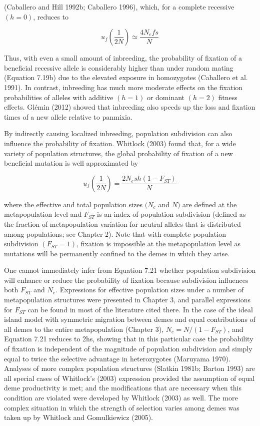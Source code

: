 \documentclass{article}
\begin{document}
(Caballero and Hill 1992b; Caballero 1996), which, for a complete recessive  $ (h = 0) $, reduces to

\begin{equation}
u_{f}\left(\frac{1}{2N}\right)\simeq\frac{4N_{e}f s}{N}
\tag{7.20c}
\label{eq:7_20c}
\end{equation}

Thus, with even a small amount of inbreeding, the probability of fixation of a beneficial recessive allele is considerably higher than under random mating (Equation 7.19b) due to the elevated exposure in homozygotes (Caballero et al. 1991). In contrast, inbreeding has much more moderate effects on the fixation probabilities of alleles with additive  $ (h=1) $ or dominant  $ (h=2) $ fitness effects. Glémin (2012) showed that inbreeding also speeds up the loss and fixation times of a new allele relative to panmixia.

By indirectly causing localized inbreeding, population subdivision can also influence the probability of fixation. Whitlock (2003) found that, for a wide variety of population structures, the global probability of fixation of a new beneficial mutation is well approximated by

\begin{equation}
u_{f}\left(\frac{1}{2N}\right)=\frac{2N_{e}s h(1-F_{S T})}{N}
\tag{7.21}
\label{eq:7_21}
\end{equation}

where the effective and total population sizes  $ (N_e $ and  $ N) $ are defined at the metapopulation level and  $ F_{ST} $ is an index of population subdivision (defined as the fraction of metapopulation variation for neutral alleles that is distributed among populations; see Chapter 2). Note that with complete population subdivision  $ (F_{ST} = 1) $, fixation is impossible at the metapopulation level as mutations will be permanently confined to the demes in which they arise.

One cannot immediately infer from Equation 7.21 whether population subdivision will enhance or reduce the probability of fixation because subdivision influences both  $ F_{ST} $ and  $ N_{e} $. Expressions for effective population sizes under a number of metapopulation structures were presented in Chapter 3, and parallel expressions for  $ F_{ST} $ can be found in most of the literature cited there. In the case of the ideal island model with symmetric migration between demes and equal contributions of all demes to the entire metapopulation (Chapter 3),  $ N_{e} = N/(1 - F_{ST}) $, and Equation 7.21 reduces to 2hs, showing that in this particular case the probability of fixation is independent of the magnitude of population subdivision and simply equal to twice the selective advantage in heterozygotes (Maruyama 1970). Analyses of more complex population structures (Slatkin 1981b; Barton 1993) are all special cases of Whitlock's (2003) expression provided the assumption of equal deme productivity is met; and the modifications that are necessary when this condition are violated were developed by Whitlock (2003) as well. The more complex situation in which the strength of selection varies among demes was taken up by Whitlock and Gomulkiewicz (2005).
\end{document}
